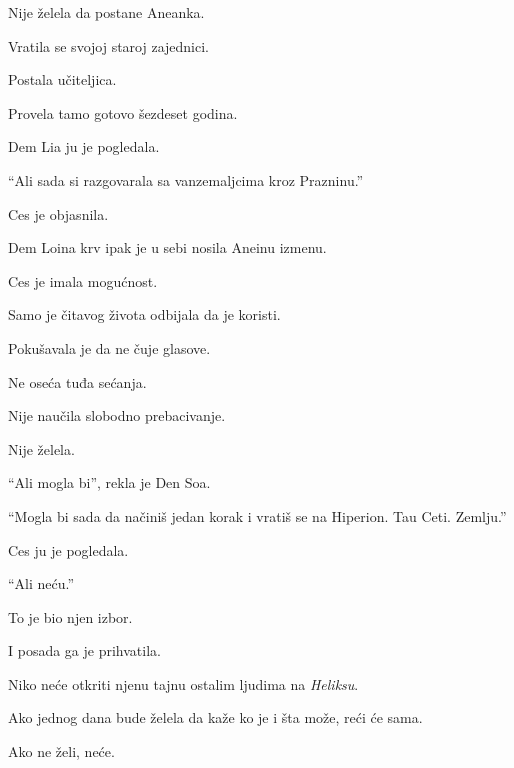 \bigskip

Nije želela da postane Aneanka.

\bigskip

Vratila se svojoj staroj zajednici.

Postala učiteljica.

Provela tamo gotovo šezdeset godina.

\bigskip

Dem Lia ju je pogledala.

``Ali sada si razgovarala sa vanzemaljcima kroz Prazninu.''

\bigskip

Ces je objasnila.

\bigskip

Dem Loina krv ipak je u sebi nosila Aneinu izmenu.

\bigskip

Ces je imala mogućnost.

\bigskip

Samo je čitavog života odbijala da je koristi.

\bigskip

Pokušavala je da ne čuje glasove.

Ne oseća tuđa sećanja.

\bigskip

Nije naučila slobodno prebacivanje.

\bigskip

Nije želela.

\bigskip

``Ali mogla bi'', rekla je Den Soa.

``Mogla bi sada da načiniš jedan korak i vratiš se na Hiperion. Tau Ceti. Zemlju.''

\bigskip

Ces ju je pogledala.

``Ali neću.''

\bigskip

To je bio njen izbor.

\bigskip

I posada ga je prihvatila.

\bigskip

Niko neće otkriti njenu tajnu ostalim ljudima na \emph{Heliksu}.

\bigskip

Ako jednog dana bude želela da kaže ko je i šta može, reći će sama.

\bigskip

Ako ne želi, neće.


